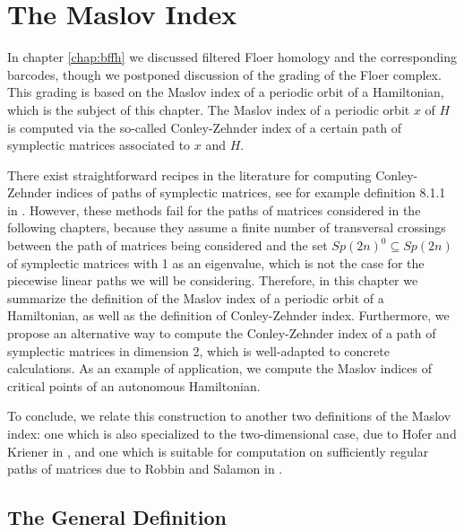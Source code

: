 \chapter{The Maslov Index}\label{chap:maslov}

In chapter \ref{chap:bffh} we discussed filtered Floer homology and the corresponding barcodes, though we postponed discussion of the grading of the Floer complex. This grading is based on the Maslov index of a periodic orbit of a Hamiltonian, which is the subject of this chapter. The Maslov index of a periodic orbit $x$ of $H$ is computed via the so-called Conley-Zehnder index of a certain path of symplectic matrices associated to $x$ and $H$.

There exist straightforward recipes in the literature for computing Conley-Zehnder indices of paths of symplectic matrices, see for example definition 8.1.1 in \cite{polterovich}. However, these methods fail for the paths of matrices considered in the following chapters, because they assume a finite number of transversal crossings between the path of matrices being considered and the set $Sp(2n)^0 \subseteq Sp(2n)$ of symplectic matrices with 1 as an eigenvalue, which is not the case for the piecewise linear paths we will be considering. Therefore, in this chapter we summarize the definition of the Maslov index of a periodic orbit of a Hamiltonian, as well as the definition of Conley-Zehnder index. Furthermore, we propose an alternative way to compute the Conley-Zehnder index of a path of symplectic matrices in dimension 2, which is well-adapted to concrete calculations. As an example of application, we compute the Maslov indices of critical points of an autonomous Hamiltonian.

To conclude, we relate this construction to another two definitions of the Maslov index: one which is also specialized to the two-dimensional case, due to Hofer and Kriener in \cite{hoferkriener}, and one which is suitable for computation on sufficiently regular paths of matrices due to Robbin and Salamon in \cite{robbin1993maslov}.

\section{The General Definition}

